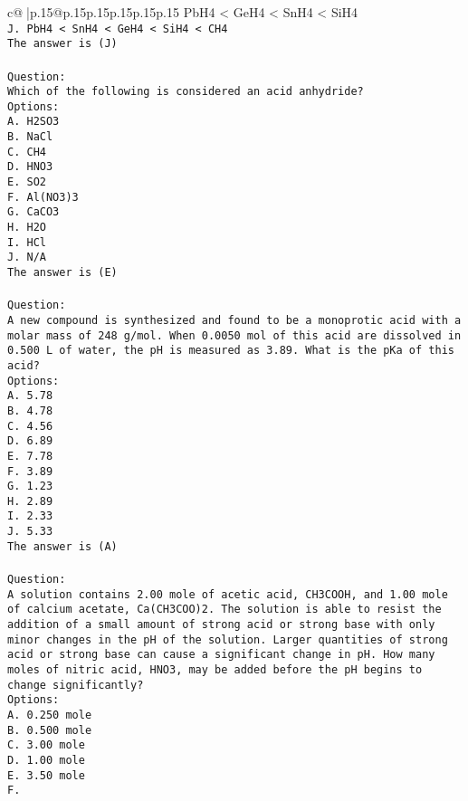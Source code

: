 \documentclass{article}
\begin{document}
{\begin{supertabular}{c@{$\;$}|p{.15\linewidth}@{}p{.15\linewidth}p{.15\linewidth}p{.15\linewidth}p{.15\linewidth}p{.15\linewidth}}
{{{PbH4 < GeH4 < SnH4 < SiH4\\ \tt J. PbH4 < SnH4 < GeH4 < SiH4 < CH4\\ \tt The answer is (J)\\ \tt \\ \tt Question:\\ \tt Which of the following is considered an acid anhydride?\\ \tt Options:\\ \tt A. H2SO3\\ \tt B. NaCl\\ \tt C. CH4\\ \tt D. HNO3\\ \tt E. SO2\\ \tt F. Al(NO3)3\\ \tt G. CaCO3\\ \tt H. H2O\\ \tt I. HCl\\ \tt J. N/A\\ \tt The answer is (E)\\ \tt \\ \tt Question:\\ \tt A new compound is synthesized and found to be a monoprotic acid with a molar mass of 248 g/mol. When 0.0050 mol of this acid are dissolved in 0.500 L of water, the pH is measured as 3.89. What is the pKa of this acid?\\ \tt Options:\\ \tt A. 5.78\\ \tt B. 4.78\\ \tt C. 4.56\\ \tt D. 6.89\\ \tt E. 7.78\\ \tt F. 3.89\\ \tt G. 1.23\\ \tt H. 2.89\\ \tt I. 2.33\\ \tt J. 5.33\\ \tt The answer is (A)\\ \tt \\ \tt Question:\\ \tt A solution contains 2.00 mole of acetic acid, CH3COOH, and 1.00 mole of calcium acetate, Ca(CH3COO)2. The solution is able to resist the addition of a small amount of strong acid or strong base with only minor changes in the pH of the solution. Larger quantities of strong acid or strong base can cause a significant change in pH. How many moles of nitric acid, HNO3, may be added before the pH begins to change significantly?\\ \tt Options:\\ \tt A. 0.250 mole\\ \tt B. 0.500 mole\\ \tt C. 3.00 mole\\ \tt D. 1.00 mole\\ \tt E. 3.50 mole\\ \tt F. }}}
\end{supertabular}}
\end{document}
